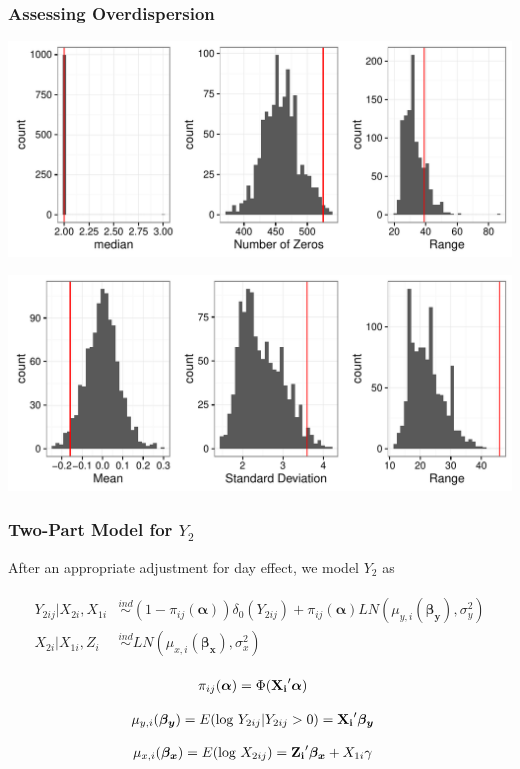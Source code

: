 \documentclass[handout]{beamer}\usepackage[]{graphicx}\usepackage[]{color}
\begin{document}
\begin{frame}
\frametitle{Assessing Overdispersion}

\centering
\includegraphics{y1ppmarg}

\includegraphics{y1ppcond}


\end{frame}

\begin{frame}
\frametitle{Two-Part Model for $Y_2$}
After an appropriate adjustment for day effect, we model $Y_2$ as

\begin{align*}
\begin{split}
	Y_{2ij}|X_{2i}, X_{1i} &\overset{ind}{\sim} (1-\pi_{ij}(\boldsymbol{\alpha})) \delta_0(Y_{2ij}) + \pi_{ij}(\boldsymbol{\alpha}) LN(\mu_{y,i} (\boldsymbol{\beta_y}), \sigma_y^2)\\
	X_{2i}|X_{1i}, Z_i &\overset{ind}{\sim} LN(\mu_{x,i} (\boldsymbol{\beta_x}), \sigma_x^2)
\end{split}
\end{align*}

\begin{align*}
\pi_{ij}(\boldsymbol{\alpha}) &= \Phi({\bf X_i}' \boldsymbol{\alpha}) 
\end{align*}

\begin{align*}
 \mu_{y,i}(\boldsymbol{\beta_y}) &=  E(\text{log } Y_{2ij}|Y_{2ij} > 0) = {\bf X_i}'\boldsymbol{\beta_y}
\end{align*} 

\begin{align*}
 \mu_{x,i}(\boldsymbol{\beta_x}) &=  E(\text{log } X_{2ij}) = {\bf Z_i}'\boldsymbol{\beta_x} + X_{1i} \gamma
\end{align*} 


\end{frame}
\end{document}
